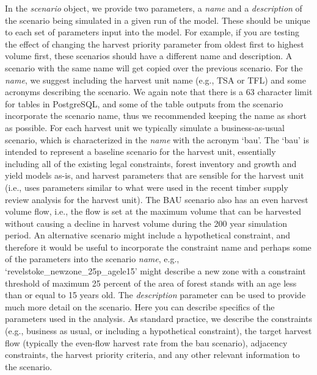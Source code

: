 \documentclass[
]{article}
\begin{document}
In the \emph{scenario} object, we provide two parameters, a \emph{name}
and a \emph{description} of the scenario being simulated in a given run
of the model. These should be unique to each set of parameters input
into the model. For example, if you are testing the effect of changing
the harvest priority parameter from oldest first to highest volume
first, these scenarios should have a different name and description. A
scenario with the same name will get copied over the previous scenario.
For the \emph{name}, we suggest including the harvest unit name (e.g.,
TSA or TFL) and some acronyms describing the scenario. We again note
that there is a 63 character limit for tables in PostgreSQL, and some of
the table outputs from the scenario incorporate the scenario name, thus
we recommended keeping the name as short as possible. For each harvest
unit we typically simulate a business-as-usual scenario, which is
characterized in the \emph{name} with the acronym `bau'. The `bau' is
intended to represent a baseline scenario for the harvest unit,
essentially including all of the existing legal constraints, forest
inventory and growth and yield models as-is, and harvest parameters that
are sensible for the harvest unit (i.e., uses parameters similar to what
were used in the recent timber supply review analysis for the harvest
unit). The BAU scenario also has an even harvest volume flow, i.e., the
flow is set at the maximum volume that can be harvested without causing
a decline in harvest volume during the 200 year simulation period. An
alternative scenario might include a hypothetical constraint, and
therefore it would be useful to incorporate the constraint name and
perhaps some of the parameters into the scenario \emph{name}, e.g.,
`revelstoke\_newzone\_25p\_agele15' might describe a new zone with a
constraint threshold of maximum 25 percent of the area of forest stands
with an age less than or equal to 15 years old. The \emph{description}
parameter can be used to provide much more detail on the scenario. Here
you can describe specifics of the parameters used in the analysis. As
standard practice, we describe the constraints (e.g., business as usual,
or including a hypothetical constraint), the target harvest flow
(typically the even-flow harvest rate from the bau scenario), adjacency
constraints, the harvest priority criteria, and any other relevant
information to the scenario.
\end{document}
